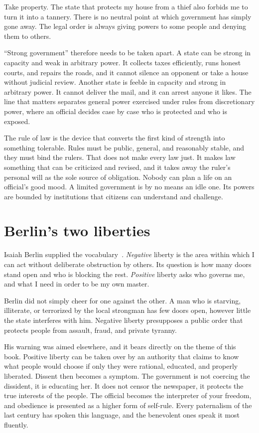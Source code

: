 \documentclass[12pt,a4paper]{book}
\begin{document}
Take property. The state that protects my house from a thief also forbids me to turn it into a tannery. There is no neutral point at which government has simply gone away. The legal order is always giving powers to some people and denying them to others.

``Strong government'' therefore needs to be taken apart. A state can be strong in capacity and weak in arbitrary power. It collects taxes efficiently, runs honest courts, and repairs the roads, and it cannot silence an opponent or take a house without judicial review. Another state is feeble in capacity and strong in arbitrary power. It cannot deliver the mail, and it can arrest anyone it likes. The line that matters separates general power exercised under rules from discretionary power, where an official decides case by case who is protected and who is exposed.

The rule of law is the device that converts the first kind of strength into something tolerable. Rules must be public, general, and reasonably stable, and they must bind the rulers. That does not make every law just. It makes law something that can be criticized and revised, and it takes away the ruler's personal will as the sole source of obligation. Nobody can plan a life on an official's good mood. A limited government is by no means an idle one. Its powers are bounded by institutions that citizens can understand and challenge.

\section{Berlin's two liberties}

Isaiah Berlin supplied the vocabulary~\cite{berlin-liberty}. \emph{Negative} liberty is the area within which I can act without deliberate obstruction by others. Its question is how many doors stand open and who is blocking the rest. \emph{Positive} liberty asks who governs me, and what I need in order to be my own master.

Berlin did not simply cheer for one against the other. A man who is starving, illiterate, or terrorized by the local strongman has few doors open, however little the state interferes with him. Negative liberty presupposes a public order that protects people from assault, fraud, and private tyranny.

His warning was aimed elsewhere, and it bears directly on the theme of this book. Positive liberty can be taken over by an authority that claims to know what people would choose if only they were rational, educated, and properly liberated. Dissent then becomes a symptom. The government is not coercing the dissident, it is educating her. It does not censor the newspaper, it protects the true interests of the people. The official becomes the interpreter of your freedom, and obedience is presented as a higher form of self-rule. Every paternalism of the last century has spoken this language, and the benevolent ones speak it most fluently.
\end{document}
